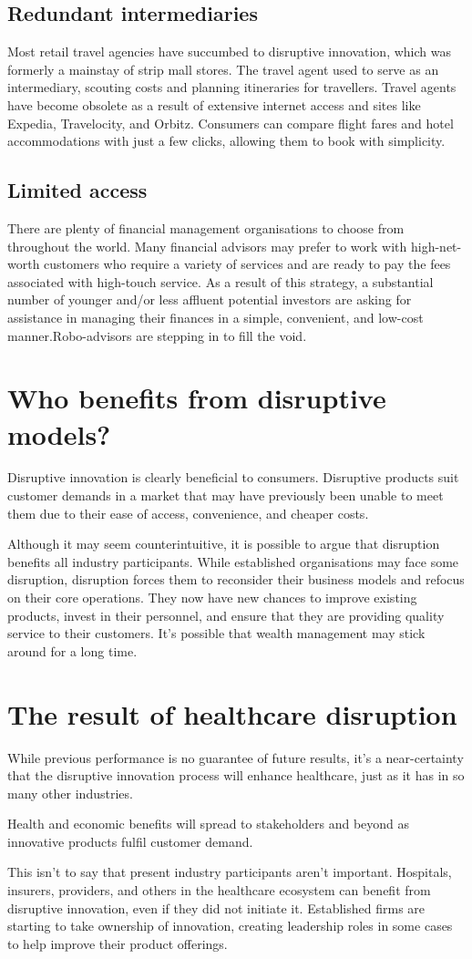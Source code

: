 \documentclass[a4paper,15pt]{article}
\begin{document}
\subsection{Redundant intermediaries}
Most retail travel agencies have succumbed to disruptive innovation, 
which was formerly a mainstay of strip mall stores. The travel agent 
used to serve as an intermediary, scouting costs and planning 
itineraries for travellers. Travel agents have become obsolete as a 
result of extensive internet access and sites like Expedia, 
Travelocity, and Orbitz. Consumers can compare flight fares and hotel
accommodations with just a few clicks, allowing them to book with 
simplicity.
\subsection{Limited access}
There are plenty of financial management organisations to choose from
throughout the world. Many financial advisors may prefer to work with
high-net-worth customers who require a variety of services and are 
ready to pay the fees associated with high-touch service. As a result
of this strategy, a substantial number of younger and/or less 
affluent potential investors are asking for assistance in managing 
their finances in a simple, convenient, and low-cost 
manner.Robo-advisors are stepping in to fill the void.
\section{Who benefits from disruptive models?}
Disruptive innovation is clearly beneficial to consumers. Disruptive
products suit customer demands in a market that may have previously 
been unable to meet them due to their ease of access, convenience, 
and cheaper costs.


Although it may seem counterintuitive, it is possible to argue that 
disruption benefits all industry participants. While established 
organisations may face some disruption, disruption forces them to 
reconsider their business models and refocus on their core 
operations. They now have new chances to improve existing products, 
invest in their personnel, and ensure that they are providing 
quality service to their customers. It's possible that wealth 
management may stick around for a long time.

\section{The result of healthcare disruption}
While previous performance is no guarantee of future results,
it's a near-certainty that the disruptive innovation process will 
enhance healthcare, just as it has in so many other industries. 

Health and economic benefits will spread to stakeholders and beyond 
as innovative products fulfil customer demand.

This isn't to say that present industry participants aren't 
important. Hospitals, insurers, providers, and others in the 
healthcare ecosystem can benefit from disruptive innovation, even if
they did not initiate it. Established firms are starting to take 
ownership of innovation, creating leadership roles in some cases to 
help improve their product offerings.
\end{document}
